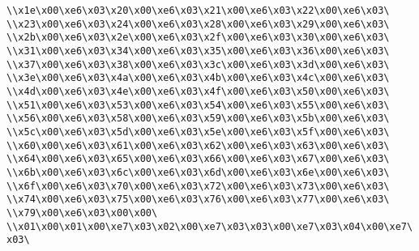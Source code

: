 \verb|\\x1e\x00\xe6\x03\x20\x00\xe6\x03\x21\x00\xe6\x03\x22\x00\xe6\x03\|\newline
\verb|\\x23\x00\xe6\x03\x24\x00\xe6\x03\x28\x00\xe6\x03\x29\x00\xe6\x03\|\newline
\verb|\\x2b\x00\xe6\x03\x2e\x00\xe6\x03\x2f\x00\xe6\x03\x30\x00\xe6\x03\|\newline
\verb|\\x31\x00\xe6\x03\x34\x00\xe6\x03\x35\x00\xe6\x03\x36\x00\xe6\x03\|\newline
\verb|\\x37\x00\xe6\x03\x38\x00\xe6\x03\x3c\x00\xe6\x03\x3d\x00\xe6\x03\|\newline
\verb|\\x3e\x00\xe6\x03\x4a\x00\xe6\x03\x4b\x00\xe6\x03\x4c\x00\xe6\x03\|\newline
\verb|\\x4d\x00\xe6\x03\x4e\x00\xe6\x03\x4f\x00\xe6\x03\x50\x00\xe6\x03\|\newline
\verb|\\x51\x00\xe6\x03\x53\x00\xe6\x03\x54\x00\xe6\x03\x55\x00\xe6\x03\|\newline
\verb|\\x56\x00\xe6\x03\x58\x00\xe6\x03\x59\x00\xe6\x03\x5b\x00\xe6\x03\|\newline
\verb|\\x5c\x00\xe6\x03\x5d\x00\xe6\x03\x5e\x00\xe6\x03\x5f\x00\xe6\x03\|\newline
\verb|\\x60\x00\xe6\x03\x61\x00\xe6\x03\x62\x00\xe6\x03\x63\x00\xe6\x03\|\newline
\verb|\\x64\x00\xe6\x03\x65\x00\xe6\x03\x66\x00\xe6\x03\x67\x00\xe6\x03\|\newline
\verb|\\x6b\x00\xe6\x03\x6c\x00\xe6\x03\x6d\x00\xe6\x03\x6e\x00\xe6\x03\|\newline
\verb|\\x6f\x00\xe6\x03\x70\x00\xe6\x03\x72\x00\xe6\x03\x73\x00\xe6\x03\|\newline
\verb|\\x74\x00\xe6\x03\x75\x00\xe6\x03\x76\x00\xe6\x03\x77\x00\xe6\x03\|\newline
\verb|\\x79\x00\xe6\x03\x00\x00\|\newline
\verb|\\x01\x00\x01\x00\xe7\x03\x02\x00\xe7\x03\x03\x00\xe7\x03\x04\x00\xe7\x03\|\newline

